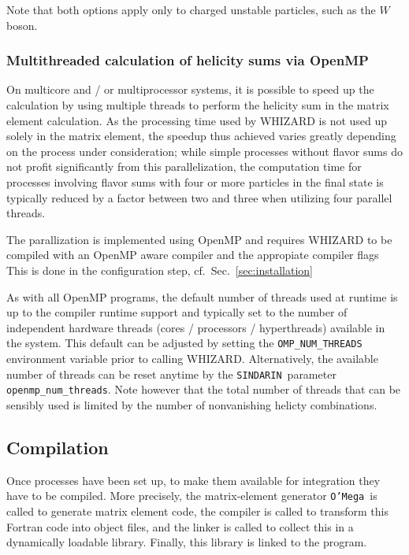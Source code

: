 \documentclass[12pt]{book}
\newcommand{\ttt}[1]{\texttt{#1}}
\newcommand{\oMega}{\texttt{O'Mega}}
\newcommand{\sindarin}{\texttt{SINDARIN}}
\begin{document}
Note that both options apply only to charged unstable particles, such as the
$W$ boson.


\subsubsection{Multithreaded calculation of helicity sums via OpenMP}
\label{sec:openmp}

On multicore and / or multiprocessor systems, it is possible to speed
up the calculation by using multiple threads to perform the helicity
sum in the matrix element calculation. As the processing time used by
WHIZARD is not used up solely in the matrix element, the speedup thus
achieved varies greatly depending on the process under consideration;
while simple processes without flavor sums do not profit significantly
from this parallelization, the computation time for processes
involving flavor sums with four or more particles in the final state
is typically reduced by a factor between two and three when utilizing
four parallel threads.

The parallization is implemented using OpenMP and requires WHIZARD to be
compiled with an OpenMP aware compiler and the appropiate compiler flags
This is done in the configuration step, cf.\
Sec.~\ref{sec:installation} 

As with all OpenMP programs, the default number of threads used at
runtime is up to the compiler runtime support and typically set to the
number of independent hardware threads (cores / processors /
hyperthreads) available in the system.  This default can be adjusted
by setting the \ttt{OMP\_NUM\_THREADS} environment variable prior to
calling WHIZARD.  Alternatively, the available number of threads can
be reset anytime by the \sindarin\ parameter
\ttt{openmp\_num\_threads}.  Note however that the total number of
threads that can be sensibly used is limited by the number of
nonvanishing helicty combinations.

\subsection{Compilation}

Once processes have been set up, to make them available for integration they
have to be compiled.  More precisely, the matrix-element generator \oMega\ is
called to generate matrix element code, the compiler is called to transform
this Fortran code into object files, and the linker is called to collect this
in a dynamically loadable library.  Finally, this library is linked to the
program.
\end{document}

